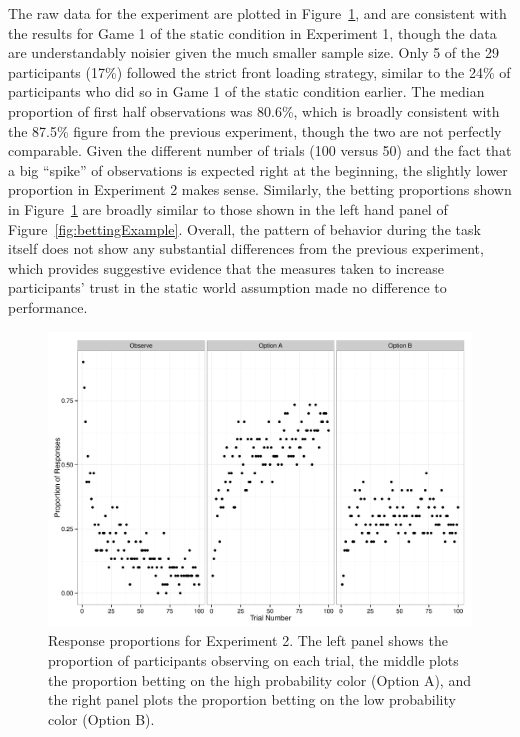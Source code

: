 \documentclass[authoryear]{elsarticle}
\begin{document}
The raw data for the experiment are plotted in Figure~\ref{fig:realLifeChoices}, and are consistent with the results for Game 1 of the static condition in Experiment 1, though the data are understandably noisier given the much smaller sample size. Only 5 of the 29 participants (17\%) followed the strict front loading strategy, similar to the 24\% of participants who did so in Game 1 of the static condition earlier. The median proportion of first half observations was 80.6\%, which is broadly consistent with the 87.5\% figure from the previous experiment, though the two are not perfectly comparable. Given the different number of trials (100 versus 50) and the fact that a big ``spike'' of observations is expected right at the beginning, the slightly lower proportion in Experiment 2 makes sense. Similarly, the betting proportions shown in Figure~\ref{fig:realLifeChoices} are broadly similar to those shown in the left hand panel of Figure~\ref{fig:bettingExample}. Overall, the pattern of behavior during the task itself does not show any substantial differences from the previous experiment, which provides suggestive evidence that the measures taken to increase participants' trust in the static world assumption made no difference to performance.

\begin{figure}[t]
\begin{center}
\includegraphics[scale=.5]{realLifeChoices.pdf}
\caption{Response proportions for Experiment 2. The left panel shows the proportion of participants observing on each trial, the middle plots the proportion betting on the high probability color (Option A), and the right panel plots the proportion betting on the low probability color (Option B).}
\label{fig:realLifeChoices}
\end{center}
\end{figure}
\end{document}

